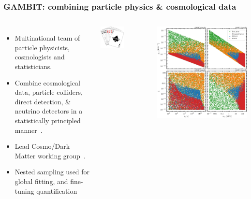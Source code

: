 \documentclass[aspectratio=169]{beamer}
\begin{document}
\begin{frame}
    \frametitle{GAMBIT: combining particle physics \& cosmological data}
    \begin{columns}
        \begin{itemize}
            \item Multinational team of particle physicists, cosmologists and statisticians.
            \item Combine cosmological data, particle colliders, direct detection, \& neutrino detectors in a statistically principled manner~.
            \item Lead Cosmo/Dark Matter working group~.
            \item Nested sampling used for global fitting, and fine-tuning quantification~
        \end{itemize}
        \begin{center}
            \includegraphics[width=0.5\textwidth]{figures/gambit_logo.png}
        \end{center}
        \vspace{-40pt}
        \includegraphics[width=\textwidth]{figures/ALP_2.pdf}
    \end{columns}
\end{frame}
\end{document}
